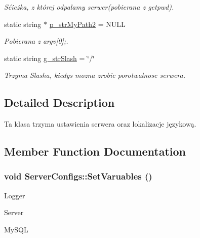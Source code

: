 \begin{DoxyCompactItemize}
\begin{DoxyCompactList}\small\item\em Sćieżka, z której odpalamy serwer(pobierana z getpwd). \item\end{DoxyCompactList}\item 
\hypertarget{classServerConfigs_a00f95326c29a3eb81c2c1233f1b0a3ab}{
static string $\ast$ \hyperlink{classServerConfigs_a00f95326c29a3eb81c2c1233f1b0a3ab}{p\_\-strMyPath2} = NULL}
\label{classServerConfigs_a00f95326c29a3eb81c2c1233f1b0a3ab}

\begin{DoxyCompactList}\small\item\em Pobierana z argv\mbox{[}0\mbox{]};. \item\end{DoxyCompactList}\item 
static string \hyperlink{classServerConfigs_ac2063e674b25db88fdea31ced792937e}{g\_\-strSlash} = \char`\"{}/\char`\"{}
\begin{DoxyCompactList}\small\item\em Trzyma Slasha, kiedys mozna zrobic porotwalnosc serwera. \item\end{DoxyCompactList}\end{DoxyCompactItemize}


\subsection{Detailed Description}
Ta klasa trzyma ustawienia serwera oraz lokalizacje językową. 

\subsection{Member Function Documentation}
\hypertarget{classServerConfigs_a79b1527bcb676e9f100ea5c2bc5849a3}{
\subsubsection[{SetVaruables}]{\setlength{\rightskip}{0pt plus 5cm}void ServerConfigs::SetVaruables ()}}
\label{classServerConfigs_a79b1527bcb676e9f100ea5c2bc5849a3}


Logger

Server

MySQL

